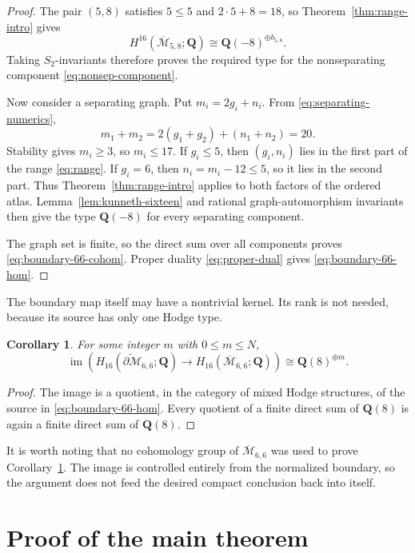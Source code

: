 \documentclass[12pt,reqno]{amsart}
\newcommand{\Q}{\mathbf{Q}}
\newcommand{\M}{\mathcal{M}}
\newcommand{\Mbar}{\overline{\mathcal{M}}}
\newcommand{\im}{\operatorname{im}}
\newtheorem{corollary}[theorem]{Corollary}
\theoremstyle{definition}
\theoremstyle{remark}
\begin{document}
\begin{proof}
The pair $(5,8)$ satisfies $5\leq5$ and
$2\cdot5+8=18$, so Theorem~\ref{thm:range-intro} gives
\[
 H^{16}(\Mbar_{5,8};\Q)\cong\Q(-8)^{\oplus b_{5,8}}.
\]
Taking $S_2$-invariants therefore proves the required type for the
nonseparating component \eqref{eq:nonsep-component}.

Now consider a separating graph.  Put $m_i=2g_i+n_i$.  From
\eqref{eq:separating-numerics},
\[
  m_1+m_2=2(g_1+g_2)+(n_1+n_2)=20.
\]
Stability gives $m_i\geq3$, so $m_i\leq17$.  If $g_i\leq5$, then
$(g_i,n_i)$ lies in the first part of the range \eqref{eq:range}.  If
$g_i=6$, then $n_i=m_i-12\leq5$, so it lies in the second part.  Thus
Theorem~\ref{thm:range-intro} applies to both factors of the ordered atlas.
Lemma~\ref{lem:kunneth-sixteen} and rational graph-automorphism invariants
then give the type $\Q(-8)$ for every separating component.

The graph set is finite, so the direct sum over all components proves
\eqref{eq:boundary-66-cohom}.  Proper duality
\eqref{eq:proper-dual} gives \eqref{eq:boundary-66-hom}.
\end{proof}

The boundary map itself may have a nontrivial kernel.  Its rank is not
needed, because its source has only one Hodge type.

\begin{corollary}\label{cor:boundary-image}
For some integer $m$ with $0\leq m\leq N$,
\[
 \im\!\left(
  H_{16}(\widetilde{\partial\M}_{6,6};\Q)
  \longrightarrow H_{16}(\Mbar_{6,6};\Q)
 \right)
 \cong\Q(8)^{\oplus m}.
\]
\end{corollary}

\begin{proof}
The image is a quotient, in the category of mixed Hodge structures, of the
source in \eqref{eq:boundary-66-hom}.  Every quotient of a finite direct sum
of $\Q(8)$ is again a finite direct sum of $\Q(8)$.
\end{proof}

It is worth noting that no cohomology group of $\Mbar_{6,6}$ was used to
prove Corollary~\ref{cor:boundary-image}.  The image is controlled entirely
from the normalized boundary, so the argument does not feed the desired
compact conclusion back into itself.

\section{Proof of the main theorem}
\end{document}
